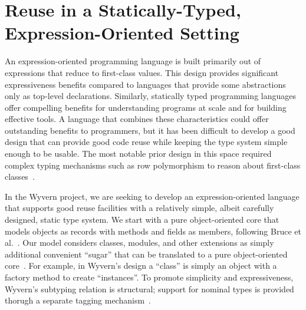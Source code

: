 \documentclass[preprint,10pt]{sigplanconf}
\begin{document}

%


\section{Reuse in a Statically-Typed, Expression-Oriented Setting}

An expression-oriented programming language is built primarily out of
expressions that reduce to first-class values.  This design provides
significant expressiveness benefits compared to languages that provide
some abstractions only as top-level declarations.  Similarly, statically
typed programming languages offer compelling benefits for understanding
programs at scale and for building effective tools.  A language that
combines these characteristics could offer outstanding benefits to
programmers, but it has been difficult to develop a good design that
can provide good code reuse while keeping
the type system simple enough to be usable.  The most notable prior
design in this space required complex typing mechanisms such as row
polymorphism to reason about first-class classes~\cite{TSDTF}.


In the Wyvern project, we are seeking to develop an expression-oriented
language that supports good reuse facilities with a relatively simple,
albeit carefully designed, static type system.  We start with a pure
object-oriented core that models objects as records with methods and
fields as members, following Bruce et al.~\cite{BCP99}. Our model
considers classes, modules, and other extensions as simply additional
convenient ``sugar'' that can be translated to a pure object-oriented
core~\cite{Nistor:2013:WST:2489828.2489830}.  For example, in Wyvern's
design a ``class'' is simply an object with a factory method to create
``instances''.  To promote simplicity and expressiveness, Wyvern's
subtyping relation is structural; support for nominal types is
provided thorugh a separate tagging
mechanism~\cite{DBLP:conf/ecoop/LeeASP15}.
\end{document}
